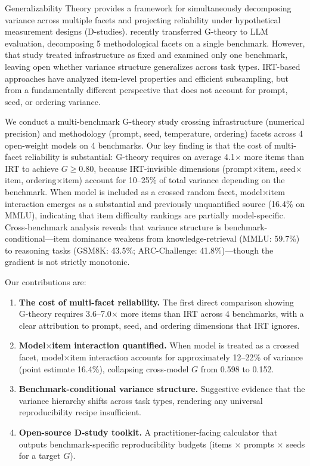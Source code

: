 \documentclass[11pt,letterpaper]{article}
\begin{document}
Generalizability Theory \citep[G-theory;][]{shavelson1991generalizability, brennan2001generalizability} provides a framework for simultaneously decomposing variance across multiple facets and projecting reliability under hypothetical measurement designs (D-studies).
\citet{mesting2026generalizability} recently transferred G-theory to LLM evaluation, decomposing 5 methodological facets on a single benchmark.
However, that study treated infrastructure as fixed and examined only one benchmark, leaving open whether variance structure generalizes across task types.
IRT-based approaches \citep{lalor2019irt, rodriguez2021irt, polo2024tinybenchmarks} have analyzed item-level properties and efficient subsampling, but from a fundamentally different perspective that does not account for prompt, seed, or ordering variance.

We conduct a multi-benchmark G-theory study crossing infrastructure (numerical precision) and methodology (prompt, seed, temperature, ordering) facets across 4 open-weight models on 4 benchmarks.
Our key finding is that the cost of multi-facet reliability is substantial: G-theory requires on average 4.1$\times$ more items than IRT to achieve $G \geq 0.80$, because IRT-invisible dimensions (prompt$\times$item, seed$\times$item, ordering$\times$item) account for 10--25\% of total variance depending on the benchmark.
When model is included as a crossed random facet, model$\times$item interaction emerges as a substantial and previously unquantified source (16.4\% on MMLU), indicating that item difficulty rankings are partially model-specific.
Cross-benchmark analysis reveals that variance structure is benchmark-conditional---item dominance weakens from knowledge-retrieval (MMLU: 59.7\%) to reasoning tasks (GSM8K: 43.5\%; ARC-Challenge: 41.8\%)---though the gradient is not strictly monotonic.

Our contributions are:
\begin{enumerate}
\item \textbf{The cost of multi-facet reliability.} The first direct comparison showing G-theory requires 3.6--7.0$\times$ more items than IRT across 4 benchmarks, with a clear attribution to prompt, seed, and ordering dimensions that IRT ignores.
\item \textbf{Model$\times$item interaction quantified.} When model is treated as a crossed facet, model$\times$item interaction accounts for approximately 12--22\% of variance (point estimate 16.4\%), collapsing cross-model $G$ from 0.598 to 0.152.
\item \textbf{Benchmark-conditional variance structure.} Suggestive evidence that the variance hierarchy shifts across task types, rendering any universal reproducibility recipe insufficient.
\item \textbf{Open-source D-study toolkit.} A practitioner-facing calculator that outputs benchmark-specific reproducibility budgets (items $\times$ prompts $\times$ seeds for a target $G$).
\end{enumerate}
\end{document}
